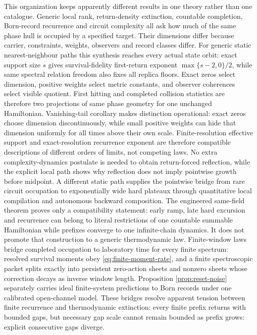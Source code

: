 This organization keeps apparently different results in one theory rather
than one catalogue.  Generic local rank, return-density extinction, countable
completion, Born-record recurrence and circuit complexity all ask how much of
the same phase hull is occupied by a specified target.  Their dimensions differ
because carrier, constraints, weights, observers and record classes differ.
For generic static nearest-neighbour paths this synthesis reaches every actual
state orbit: exact support size $s$ gives survival-fidelity first-return
exponent $\max\{s-2,0\}/2$, while same spectral relation freedom also fixes all
replica floors.  Exact zeros select dimension, positive weights select metric
constants, and observer coherences select visible quotient.  First hitting
and completed collision statistics are therefore two projections of same
phase geometry for one unchanged Hamiltonian.
Vanishing-tail corollary makes distinction operational: exact zeros choose
dimension discontinuously, while small positive weights can hide that
dimension uniformly for all times above their own scale.  Finite-resolution
effective support and exact-resolution recurrence exponent are therefore
compatible descriptions of different orders of limits, not competing laws.
No extra complexity-dynamics postulate is needed to obtain return-forced
reflection, while the explicit local path shows why reflection does not imply
pointwise growth before midpoint.  A different static path supplies the
pointwise bridge from rare circuit occupation to exponentially wide hard
plateaux through quantitative local compilation and autonomous backward
composition.  The engineered same-field theorem proves only a compatibility
statement: early ramp, late hard excursion and recurrence can belong to
literal restrictions of one countable summable Hamiltonian while prefixes
converge to one infinite-chain dynamics.  It does not promote that
construction to a generic thermodynamic law.  Finite-window laws bridge
completed occupation to laboratory time for every finite spectrum: resolved
survival moments obey \eqref{eq:finite-moment-rate}, and a finite
spectroscopic packet splits exactly into persistent zero-action sheets and
nonzero sheets whose correction decays as inverse window length.  Proposition
\ref{prop:reset-noise} separately carries ideal finite-system predictions to
Born records under one calibrated open-channel model.  These bridges resolve
apparent tension between finite recurrence and thermodynamic extinction:
every finite prefix returns with bounded gaps, but necessary gap scale cannot
remain bounded as prefix grows: explicit consecutive gaps diverge.

